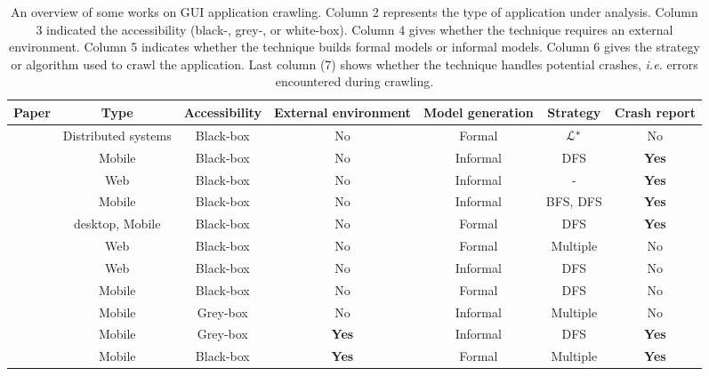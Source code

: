 \begin{sidewaystable}
    \begin{center}
	\begin{tabular}{| c | c | c | c | c | c | c |}

		\hline

        Paper & Type & Accessibility & External environment & Model
        generation & Strategy & Crash report \\
		\hline

        \cite{hungar2002} & Distributed systems & Black-box & No &
        Formal & $\EuScript{L}^*$ & No
        \\
        \cite{Joorabchi:2012:REI:2420240.2420457} & Mobile &
        Black-box & No & Informal & DFS & \textbf{Yes}
        \\
		\cite{webmate12} & Web & Black-box & No & Informal & - & \textbf{Yes}
        \\
        \cite{5954416,Amalfitano:2012:UGR:2351676.2351717} &
        Mobile & Black-box  & No & Informal  & BFS, DFS & \textbf{Yes}
        \\
		\cite{guitar,MobiGUITARIEEESoftware2014} & desktop,
		Mobile & Black-box & No & Formal & DFS & \textbf{Yes}
        \\
        \cite{crawljax:tweb12} & Web & Black-box & No & Formal &
        Multiple & No
        \\
        \cite{4656395} & Web & Black-box & No & Informal & DFS & No
        \\
        \cite{Choi2013} & Mobile & Black-box & No & Formal & DFS &
        No
        \\
		\cite{WPX13} & Mobile & Grey-box & No & Informal & Multiple
		& No
        \\
        \cite{Azim13} & Mobile & Grey-box & \textbf{Yes} & Informal & DFS
        & \textbf{Yes}
        \\
        \cite{SP15} & Mobile & Black-box & \textbf{Yes} & Formal &
        Multiple & \textbf{Yes}
        \\
		\hline
	\end{tabular}
\end{center}

    \caption{An overview of some works on GUI application
    crawling. Column 2 represents the type of application under
    analysis. Column 3 indicated the accessibility (black-,
    grey-, or white-box). Column 4 gives whether the technique
    requires an external environment. Column 5 indicates whether
    the technique builds formal models or informal models. Column
    6 gives the strategy or algorithm used to crawl the
    application. Last column (7) shows whether the technique
    handles potential crashes, \emph{i.e.} errors encountered
    during crawling.}
	\label{table:gui_works}
\end{sidewaystable}

